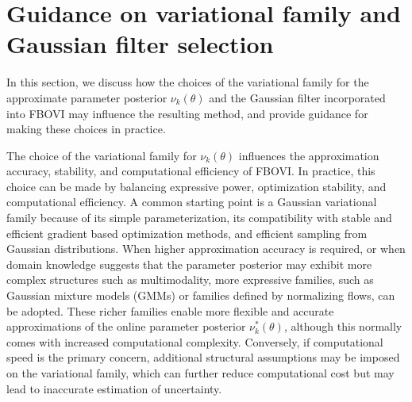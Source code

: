 \documentclass[preprint,3p,times]{elsarticle}
\begin{document}
\section{Guidance on variational family and Gaussian filter selection}
\label{sec:guidance}
In this section, we discuss how the choices of the variational family for the approximate parameter posterior $\nu_k(\theta)$ and the Gaussian filter incorporated into FBOVI may influence the resulting method, and provide guidance for making these choices in practice.


The choice of the variational family for $\nu_k(\theta)$ influences the approximation accuracy, stability, and computational efficiency of FBOVI. In practice, this choice can be made by balancing expressive power, optimization stability, and computational efficiency. A common starting point is a Gaussian variational family because of its simple parameterization, its compatibility with stable and efficient gradient based optimization methods, and efficient sampling from Gaussian distributions. When higher approximation accuracy is required, or when domain knowledge suggests that the parameter posterior may exhibit more complex structures such as multimodality, more expressive families, such as Gaussian mixture models (GMMs) or families defined by normalizing flows, can be adopted. These richer families enable more flexible and accurate approximations of the online parameter posterior $\nu_k^*(\theta)$, although this normally comes with increased computational complexity. Conversely, if computational speed is the primary concern, additional structural assumptions may be imposed on the variational family, which can further reduce computational cost but may lead to inaccurate estimation of uncertainty.
\end{document}
